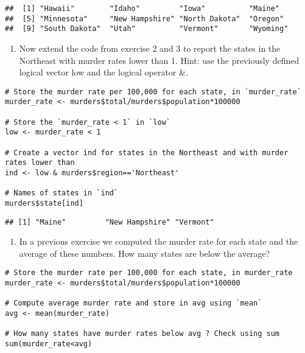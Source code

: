 \documentclass[
]{article}
\providecommand{\tightlist}{%
  \setlength{\itemsep}{0pt}\setlength{\parskip}{0pt}}
\begin{document}
\begin{verbatim}
##  [1] "Hawaii"        "Idaho"         "Iowa"          "Maine"        
##  [5] "Minnesota"     "New Hampshire" "North Dakota"  "Oregon"       
##  [9] "South Dakota"  "Utah"          "Vermont"       "Wyoming"
\end{verbatim}

\begin{enumerate}
\def\labelenumi{\arabic{enumi}.}
\setcounter{enumi}{3}
\tightlist
\item
  Now extend the code from exercise 2 and 3 to report the states in the
  Northeast with murder rates lower than 1. Hint: use the previously
  defined logical vector low and the logical operator \&.
\end{enumerate}

\begin{verbatim}
# Store the murder rate per 100,000 for each state, in `murder_rate`
murder_rate <- murders$total/murders$population*100000

# Store the `murder_rate < 1` in `low` 
low <- murder_rate < 1

# Create a vector ind for states in the Northeast and with murder rates lower than
ind <- low & murders$region=='Northeast'

# Names of states in `ind` 
murders$state[ind] 
\end{verbatim}

\begin{verbatim}
## [1] "Maine"         "New Hampshire" "Vermont"
\end{verbatim}

\begin{enumerate}
\def\labelenumi{\arabic{enumi}.}
\setcounter{enumi}{4}
\tightlist
\item
  In a previous exercise we computed the murder rate for each state and
  the average of these numbers. How many states are below the average?
\end{enumerate}

\begin{verbatim}
# Store the murder rate per 100,000 for each state, in murder_rate
murder_rate <- murders$total/murders$population*100000

# Compute average murder rate and store in avg using `mean` 
avg <- mean(murder_rate)

# How many states have murder rates below avg ? Check using sum 
sum(murder_rate<avg)
\end{verbatim}
\end{document}

